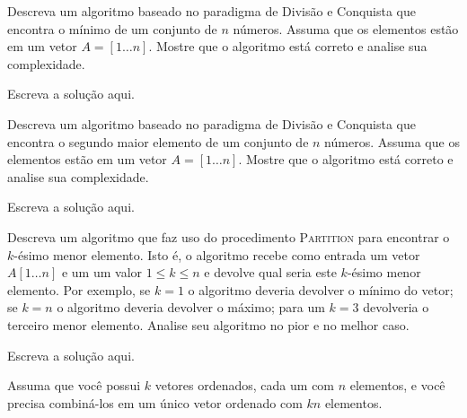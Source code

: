 \documentclass[a4paper]{exam}
\begin{document}
\begin{questions}
  \question Descreva um algoritmo baseado no paradigma de Divisão
  e Conquista que encontra o mínimo de um conjunto de $n$ números.
  Assuma que os elementos estão em um vetor $A = [1\ldots n]$.
  Mostre que o algoritmo está correto e analise sua complexidade.
  \begin{solution}
    Escreva a solução aqui.
  \end{solution}
  \question Descreva um algoritmo baseado no paradigma de Divisão
  e Conquista que encontra o segundo maior elemento de um conjunto
  de $n$ números. Assuma que os elementos estão
  em um vetor $A = [1\ldots n]$. Mostre que o algoritmo está
  correto e analise sua complexidade.
  \begin{solution}
    Escreva a solução aqui.
  \end{solution}
  \question Descreva um algoritmo que faz uso do procedimento
  \textsc{Partition} para encontrar o $k$-ésimo menor elemento.
  Isto é, o algoritmo recebe como entrada um vetor $A[1 \ldots n]$ e um
  um valor $1 \leq k \leq n$ e devolve qual seria este $k$-ésimo
  menor elemento. Por exemplo, se $k = 1$ o algoritmo deveria
  devolver o mínimo do vetor; se $k=n$ o algoritmo deveria devolver
  o máximo; para um $k=3$ devolveria o terceiro menor elemento.
  Analise seu algoritmo no pior e no melhor caso.
  \begin{solution}
    Escreva a solução aqui.
  \end{solution}
  \question Assuma que você possui $k$ vetores ordenados, cada um
  com $n$ elementos, e você precisa combiná-los em um único vetor
  ordenado com $k n$ elementos.
\end{questions}
\end{document}
